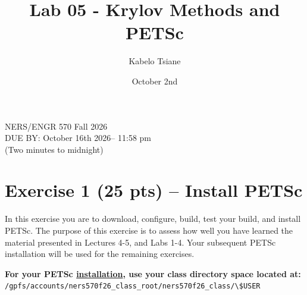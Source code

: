 \documentclass[letterpaper]{article}
\title{Lab 05 - Krylov Methods and PETSc}
\author{Kabelo Tsiane}
\date{October 2nd \year}
\renewcommand{\year}{2026}
\newcommand{\duedate}{October 16th \year -- 11:58 pm\\ (Two minutes to midnight)}
\begin{document}
\maketitle

\begin{center}
    NERS/ENGR 570 Fall \year \\
    DUE BY: \duedate \\
\end{center}


\section*{Exercise 1 (25 pts) -- Install PETSc}

In this exercise you are to download, configure, build, test your build, and install PETSc.
The purpose of this exercise is to assess how well you have learned the material presented in Lectures 4-5, and Labs 1-4.
Your subsequent PETSc installation will be used for the remaining exercises.

\textbf{For your PETSc \underline{installation}, use your class directory space located at:}\\
\lstinline{/gpfs/accounts/ners570f26_class_root/ners570f26_class/\$USER}
\end{document}
